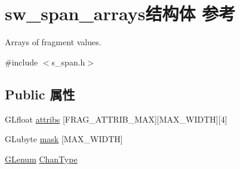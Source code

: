 \hypertarget{structsw__span__arrays}{}\section{sw\+\_\+span\+\_\+arrays结构体 参考}
\label{structsw__span__arrays}


Arrays of fragment values.  




{\ttfamily \#include $<$s\+\_\+span.\+h$>$}

\subsection*{Public 属性}
\begin{DoxyCompactItemize}
\item 
G\+Lfloat \hyperlink{structsw__span__arrays_a84299c89dce42d427519abbf8257b944}{attribs} \mbox{[}F\+R\+A\+G\+\_\+\+A\+T\+T\+R\+I\+B\+\_\+\+M\+AX\mbox{]}\mbox{[}M\+A\+X\+\_\+\+W\+I\+D\+TH\mbox{]}\mbox{[}4\mbox{]}
\item 
G\+Lubyte \hyperlink{structsw__span__arrays_af5db74346e3372a3cfbbf6dafc7fd1fb}{mask} \mbox{[}M\+A\+X\+\_\+\+W\+I\+D\+TH\mbox{]}
\item 
\hyperlink{interfacevoid}{G\+Lenum} \hyperlink{structsw__span__arrays_a59206994ff53f9333ac90dd799e5af51}{Chan\+Type}
\end{DoxyCompactItemize}
\textbf{ }\par
